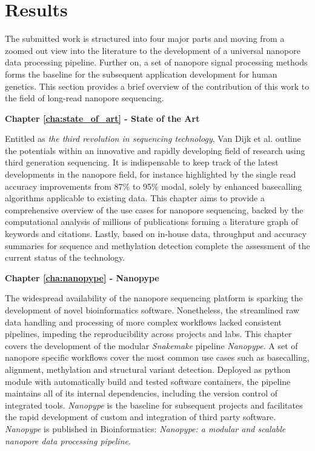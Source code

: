 \section{Results}
\label{sec:intro:structure}

The submitted work is structured into four major parts and moving from a zoomed out view into the literature to the development of a universal nanopore data processing pipeline. 
Further on, a set of nanopore signal processing methods forms the baseline for the subsequent application development for human genetics.
This section provides a brief overview of the contribution of this work to the field of long-read nanopore sequencing.

\textbf{Chapter \ref{cha:state_of_art} - State of the Art}

Entitled as \textit{the third revolution in sequencing technology}, Van Dijk et al. \cite{Dijk2018} outline the potentials within an innovative and rapidly developing field of research using third generation sequencing.
It is indispensable to keep track of the latest developments in the nanopore field, for instance highlighted by the single read accuracy improvements from 87\% to 95\% modal, solely by enhanced basecalling algorithms applicable to existing data.
This chapter aims to provide a comprehensive overview of the use cases for nanopore sequencing, backed by the computational analysis of millions of publications forming a literature graph of keywords and citations.
Lastly, based on in-house data, throughput and accuracy summaries for sequence and methylation detection complete the assessment of the current status of the technology.


\textbf{Chapter \ref{cha:nanopype} - Nanopype}

The widespread availability of the nanopore sequencing platform is sparking the development of novel bioinformatics software.
Nonetheless, the streamlined raw data handling and processing of more complex workflows lacked consistent pipelines, impeding the reproducibility across projects and labs.
This chapter covers the development of the modular \textit{Snakemake} pipeline \textit{Nanopype}.
A set of nanopore specific workflows cover the most common use cases such as basecalling, alignment, methylation and structural variant detection.
Deployed as python module with automatically build and tested software containers, the pipeline maintains all of its internal dependencies, including the version control of integrated tools.
\textit{Nanopype} is the baseline for subsequent projects and facilitates the rapid development of custom and integration of third party software.
\textit{Nanopype} is published in Bioinformatics: \textit{Nanopype: a modular and scalable nanopore data processing pipeline}.


